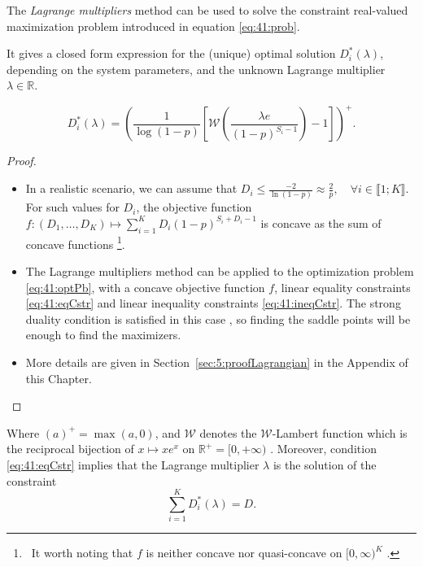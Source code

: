 \begin{proposition}\label{prop:41:Lagrangian}
    The \emph{Lagrange multipliers} method \cite{BoydVanderberghe04} can be used to solve the constraint real-valued maximization problem introduced in equation \eqref{eq:41:prob}.

    It gives a closed form expression for the (unique) optimal solution $D_i^*(\lambda)$, depending on the system parameters, and the unknown Lagrange multiplier $\lambda \in \mathbb{R}$.

    \begin{equation}\label{eq:41:Dilambda}
        D_i^*(\lambda) = \left(\frac{1}{\log(1-p)}\left[ \mathcal{W}\left(\frac{\lambda e}{(1-p)^{S_i-1}} \right)-1 \right]\right)^{+} .
    \end{equation}
\end{proposition}

\begin{proof}
\begin{itemize}
    \item
    In a realistic scenario, we can assume that $D_i\leq \frac{-2}{\ln\left(1-p\right)} \approx \frac{2}{p},\quad \forall i\in\llbracket 1;K \rrbracket$. For such values for $D_i$, the objective function $f: (D_1, \dots, D_{K}) \mapsto \sum_{i=1}^{K} D_i (1 - p)^{S_i + D_i -1}$ is concave as the sum of concave functions
    \footnote{~It worth noting that $f$ is neither concave nor quasi-concave on $[0,\infty)^{K}$ \cite{Luenberger68,Yaari77}.}.
    \item
    The Lagrange multipliers method can be applied to the optimization problem \eqref{eq:41:optPb}, with a concave objective function $f$, linear equality constraints \eqref{eq:41:eqCstr} and linear inequality constraints \eqref{eq:41:ineqCstr}. The strong duality condition is satisfied in this case \cite{BoydVanderberghe04}, so finding the saddle points will be enough to find the maximizers.
    \item
    More details are given in Section~\ref{sec:5:proofLagrangian} in the Appendix of this Chapter.
    \end{itemize}
\end{proof}

Where $(a)^{+} = \max(a,0)$, and $\mathcal{W}$ denotes the $\mathcal{W}$-Lambert function which is the reciprocal bijection of $x \mapsto x e^x$ on $\mathbb{R^+} = [0, +\infty)$ \cite{Corless96}.
Moreover, condition \eqref{eq:41:eqCstr} implies that the Lagrange multiplier $\lambda$ is the solution of the constraint
\begin{equation}\label{eq:41:constraintLambda}
 \sum_{i=1}^{K} D_i^*(\lambda) = D.
\end{equation}


